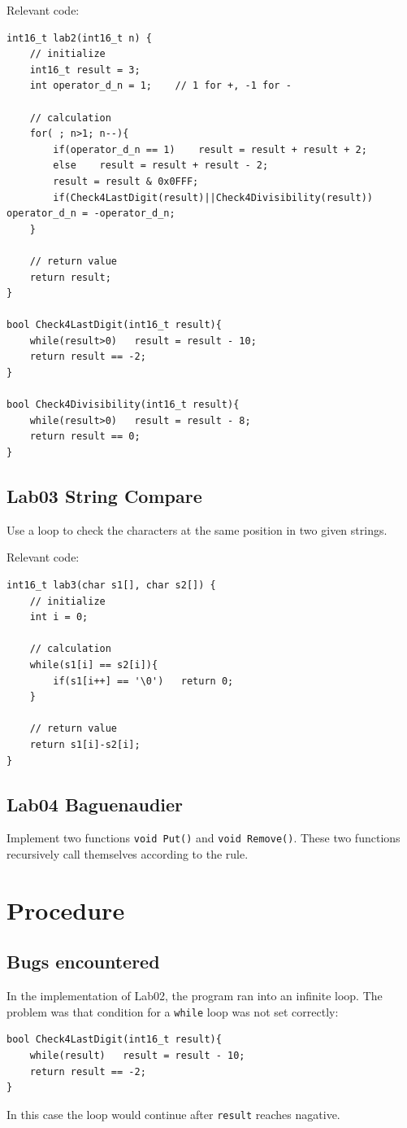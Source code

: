 \documentclass[UTF8]{ctexart}
\begin{document}
Relevant code:
\begin{lstlisting}[caption = {Lab02}]
int16_t lab2(int16_t n) {
    // initialize
    int16_t result = 3;
    int operator_d_n = 1;    // 1 for +, -1 for -

    // calculation
    for( ; n>1; n--){
        if(operator_d_n == 1)    result = result + result + 2;
        else    result = result + result - 2;
        result = result & 0x0FFF;
        if(Check4LastDigit(result)||Check4Divisibility(result))   operator_d_n = -operator_d_n;
    }

    // return value
    return result;
}

bool Check4LastDigit(int16_t result){
    while(result>0)   result = result - 10;
    return result == -2;
}

bool Check4Divisibility(int16_t result){
    while(result>0)   result = result - 8; 
    return result == 0;
}
\end{lstlisting}

\subsection{Lab03 String Compare}
Use a loop to check the characters at the same position in two given strings.

Relevant code:
\begin{lstlisting}[caption = {Lab03}]
int16_t lab3(char s1[], char s2[]) {
    // initialize
    int i = 0;

    // calculation
    while(s1[i] == s2[i]){
        if(s1[i++] == '\0')   return 0;
    }

    // return value
    return s1[i]-s2[i];
}
\end{lstlisting}

\subsection{Lab04 Baguenaudier}
Implement two functions \lstinline{void Put()} and \lstinline{void Remove()}. These two 
functions recursively call themselves according to the rule.



\section{Procedure}
\subsection{Bugs encountered}
In the implementation of Lab02, the program ran into an infinite loop. The problem was that 
condition for a \lstinline{while} loop was not set correctly:
\begin{lstlisting}
bool Check4LastDigit(int16_t result){
    while(result)   result = result - 10;
    return result == -2;
}
\end{lstlisting}
In this case the loop would continue after \lstinline{result} reaches nagative.
\end{document}
